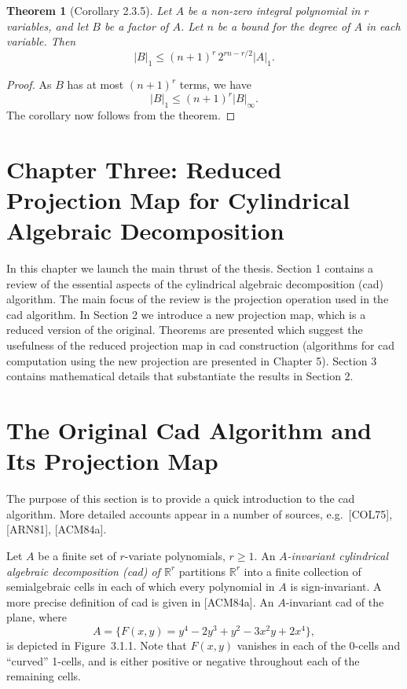 \documentclass[11pt]{article}
\theoremstyle{plain}
\newtheorem*{theorem*}{Theorem}
\theoremstyle{definition}
\newcommand{\R}{\mathbb{R}}
\begin{document}
\begin{theorem*}[Corollary 2.3.5]
Let $A$ be a non-zero integral polynomial in $r$ variables, and let $B$
be a factor of $A$. Let $n$ be a bound for the degree of $A$ in each
variable. Then
\[
|B|_1 \le (n+1)^r \, 2^{rn - r/2} |A|_1.
\]
\end{theorem*}

\begin{proof}
As $B$ has at most $(n+1)^r$ terms, we have
\[
|B|_1 \le (n+1)^r |B|_\infty.
\]
The corollary now follows from the theorem.
\end{proof}

\section*{Chapter Three: Reduced Projection Map for Cylindrical Algebraic Decomposition}

In this chapter we launch the main thrust of the thesis. Section 1
contains a review of the essential aspects of the cylindrical algebraic
decomposition (cad) algorithm. The main focus of the review is the
projection operation used in the cad algorithm. In Section 2 we
introduce a new projection map, which is a reduced version of the
original. Theorems are presented which suggest the usefulness of the
reduced projection map in cad construction (algorithms for cad
computation using the new projection are presented in Chapter 5).
Section 3 contains mathematical details that substantiate the results
in Section 2.

\section{The Original Cad Algorithm and Its Projection Map}

The purpose of this section is to provide a quick introduction to the
cad algorithm. More detailed accounts appear in a number of sources,
e.g.~[COL75], [ARN81], [ACM84a].

Let $A$ be a finite set of $r$-variate polynomials, $r \ge 1$. An
\emph{$A$-invariant cylindrical algebraic decomposition (cad) of $\R^r$}
partitions $\R^r$ into a finite collection of semialgebraic cells in
each of which every polynomial in $A$ is sign-invariant. A more precise
definition of cad is given in [ACM84a]. An $A$-invariant cad of the
plane, where
\[
A = \{ F(x, y) = y^4 - 2y^3 + y^2 - 3x^2 y + 2x^4 \},
\]
is depicted in Figure~3.1.1. Note that $F(x, y)$ vanishes in each of the
0-cells and ``curved'' 1-cells, and is either positive or negative
throughout each of the remaining cells.
\end{document}
